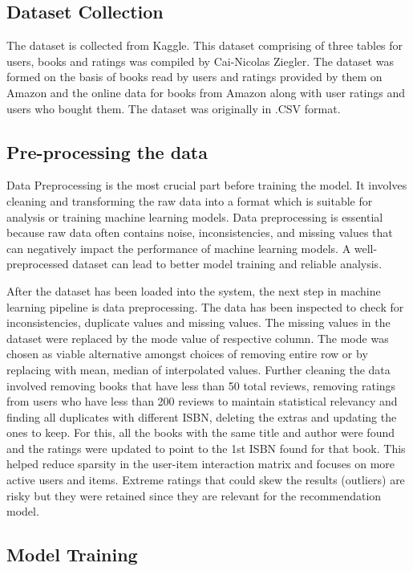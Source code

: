 \subsection{Dataset Collection}
The dataset is collected from Kaggle. This dataset comprising of three tables for users, books and ratings was compiled by Cai-Nicolas Ziegler. The dataset was formed on the basis of books read by users and ratings provided by them on Amazon and the online data for books from Amazon along with user ratings and users who bought them. The dataset was originally in .CSV format.

\subsection{Pre-processing the data}
Data Preprocessing is the most crucial part before training the model.
It involves cleaning and transforming the raw data into a format which is suitable for analysis or training machine learning models. Data preprocessing is essential because raw data often contains noise, inconsistencies, and missing values that can negatively impact the performance of machine learning models. A well-preprocessed dataset can lead to better model training and reliable analysis.

     After the dataset has been loaded into the system, the next step in machine learning pipeline is data preprocessing. The data has been inspected to check for inconsistencies, duplicate values and missing values. The missing values in the dataset were replaced by the mode value of respective column. The mode was chosen as viable alternative amongst choices of removing entire row or by replacing with mean, median of interpolated values.
     Further cleaning the data involved removing books that have less than 50 total reviews,
         removing ratings from users who have less than 200 reviews to maintain statistical relevancy and
         finding all duplicates with different ISBN, deleting the extras and updating the ones to keep. For this, all the books with the same title and author were found and the ratings were updated to point to the 1st ISBN found for that book. This helped reduce sparsity in the user-item interaction matrix and focuses on more active users and items. 
     Extreme ratings that could skew the results (outliers) are risky but they were retained since they are relevant for the recommendation model.

\subsection{ Model Training}

